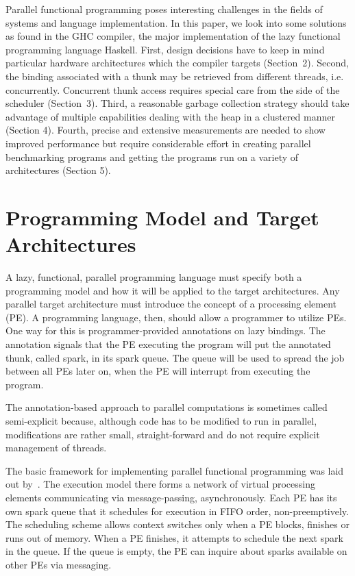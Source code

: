 \documentclass[11pt]{extarticle}
\begin{document}
Parallel functional programming poses interesting challenges in the fields of systems and language implementation. In this paper, we look into some solutions as found in the GHC compiler, the major implementation of the lazy functional programming language Haskell. 
First, design decisions have to keep in mind particular hardware architectures which the compiler targets (Section~2).
Second, the binding associated with a thunk may be retrieved from different threads, i.e. concurrently. Concurrent thunk access requires special care from the side of the scheduler (Section~3). Third, a reasonable garbage collection strategy should take advantage of multiple capabilities dealing with the heap in a clustered manner (Section 4). Fourth, precise and extensive measurements are needed to show improved performance but require considerable effort in creating parallel benchmarking programs and getting the programs run on a variety of architectures (Section 5).

\section{Programming Model and Target Architectures}
\label{sec:model}

A lazy, functional, parallel programming language must specify both a programming model and how it will be applied to the target architectures.
Any parallel target architecture must introduce the concept of a processing element (PE). A programming language, then, should allow a programmer to utilize PEs.
One way for this is programmer-provided annotations on lazy bindings. The annotation signals that the PE executing the program will put the annotated thunk, called spark, in its spark queue. The queue will be used to spread the job between all PEs later on, when the PE will interrupt from executing the program.

The annotation-based approach to parallel computations is sometimes called semi-explicit because, although code has to be modified to run in parallel, modifications are rather small, straight-forward and do not require explicit management of threads.

The basic framework for implementing parallel functional programming was laid out by~\cite{Trinder96}. The execution model there forms a network of virtual processing elements communicating via message-passing, asynchronously. Each PE has its own spark queue that it schedules for execution in FIFO order, non-preemptively. The scheduling scheme allows context switches only when a PE blocks, finishes or runs out of memory. When a PE finishes, it attempts to schedule the next spark in the queue. If the queue is empty, the PE can inquire about sparks available on other PEs via messaging.
\end{document}
